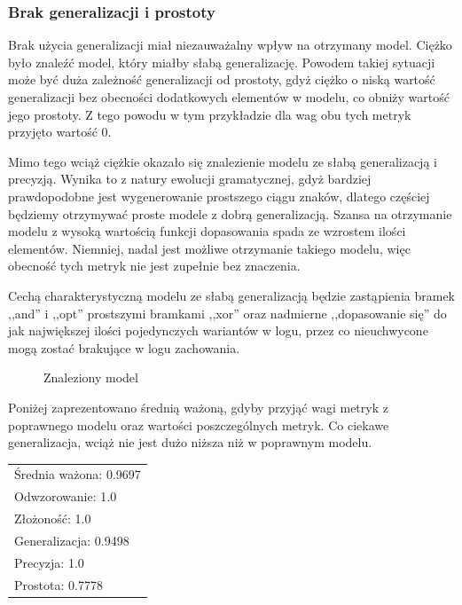 \subsubsection{Brak generalizacji i prostoty}
\label{sec:no-generalization-and-simplicity}
Brak użycia generalizacji miał niezauważalny wpływ na otrzymany model. Ciężko było znaleźć model, który miałby słabą generalizację. Powodem takiej sytuacji może być duża zależność generalizacji od prostoty, gdyż ciężko o niską wartość generalizacji bez obecności dodatkowych elementów w modelu, co obniży wartość jego prostoty. Z tego powodu w tym przykładzie dla wag obu tych metryk przyjęto wartość 0.

Mimo tego wciąż ciężkie okazało się znalezienie modelu ze słabą generalizacją i precyzją. Wynika to z natury ewolucji gramatycznej, gdyż bardziej prawdopodobne jest wygenerowanie prostszego ciągu znaków, dlatego częściej będziemy otrzymywać proste modele z dobrą generalizacją. Szansa na otrzymanie modelu z wysoką wartością funkcji dopasowania spada ze wzrostem ilości elementów. Niemniej, nadal jest możliwe otrzymanie takiego modelu, więc obecność tych metryk nie jest zupełnie bez znaczenia.

Cechą charakterystyczną modelu ze słabą generalizacją będzie zastąpienia bramek ,,and'' i ,,opt'' prostszymi bramkami ,,xor'' oraz nadmierne ,,dopasowanie się'' do jak największej ilości pojedynczych wariantów w logu, przez co nieuchwycone mogą zostać brakujące w logu zachowania.

\begin{figure}[H]
	\caption{\label{fig:no-generalization-and-simplicity}Znaleziony model}
\end{figure}

Poniżej zaprezentowano średnią ważoną, gdyby przyjąć wagi metryk z poprawnego modelu  oraz wartości poszczególnych metryk. Co ciekawe generalizacja, wciąż nie jest dużo niższa niż w poprawnym modelu.
 
 \begin{center}
  \begin{tabular}{l}
	Średnia ważona: 0.9697 \\
	Odwzorowanie: 1.0 \\
	Złożoność: 1.0 \\
	Generalizacja: 0.9498 \\
	Precyzja: 1.0 \\
	Prostota: 0.7778
  \end{tabular}
 \end{center}

